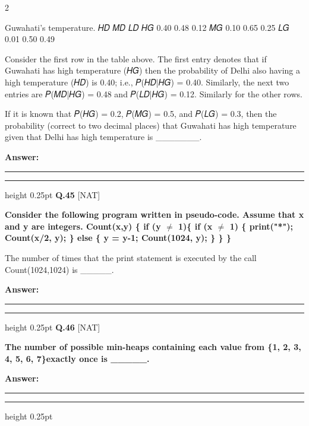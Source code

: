 \documentclass[a4paper,10pt,twoside]{article}
\begin{document}
\begin{multicols}{2}
{Guwahati's temperature.
𝐻𝐷
𝑀𝐷
𝐿𝐷
𝐻𝐺
0.40
0.48
0.12
𝑀𝐺
0.10
0.65
0.25
𝐿𝐺
0.01
0.50
0.49
\par\smallskip
Consider the first row in the table above. The first entry denotes that if Guwahati has high
temperature (𝐻𝐺) then the probability of Delhi also having a high temperature (𝐻𝐷) is 0.40;
i.e., 𝑃(𝐻𝐷|𝐻𝐺) = 0.40. Similarly, the next two entries are 𝑃(𝑀𝐷|𝐻𝐺) = 0.48 and
𝑃(𝐿𝐷|𝐻𝐺) = 0.12. Similarly for the other rows.
\par\smallskip
If it is known that 𝑃(𝐻𝐺) = 0.2, 𝑃(𝑀𝐺) = 0.5, and 𝑃(𝐿𝐺) = 0.3, then the probability
(correct to two decimal places) that Guwahati has high temperature given that Delhi has high
temperature is \_\_\_\_\_\_\_. \par}
\par\vspace{3pt}\noindent\textbf{Answer:} \rule{3.2cm}{0.4pt}
\par\vspace{6pt}\hrule height 0.25pt\vspace{6pt}
\noindent\textbf{Q.45} \hfill {\footnotesize\textsf{[NAT]}}
\par\vspace{2pt}
{\bfseries Consider the following program written in pseudo-code. Assume that x and y are integers.
Count(x,y) \{
if (y $\ne$ 1)\{
if (x $\ne$ 1) \{
print("*");
Count(x/2, y);
\}
else \{
y = y-1;
Count(1024, y);
\}
\}
\}
\par\smallskip
The number of times that the print statement is executed by the call
Count(1024,1024) is \_\_\_\_\_. \par}
\par\vspace{3pt}\noindent\textbf{Answer:} \rule{3.2cm}{0.4pt}
\par\vspace{6pt}\hrule height 0.25pt\vspace{6pt}
\noindent\textbf{Q.46} \hfill {\footnotesize\textsf{[NAT]}}
\par\vspace{2pt}
{\bfseries The number of possible min-heaps containing each value from \{1, 2, 3, 4, 5, 6, 7\}exactly once
is \_\_\_\_\_. \par}
\par\vspace{3pt}\noindent\textbf{Answer:} \rule{3.2cm}{0.4pt}
\par\vspace{6pt}\hrule height 0.25pt\vspace{6pt}

\end{multicols}
\end{document}
